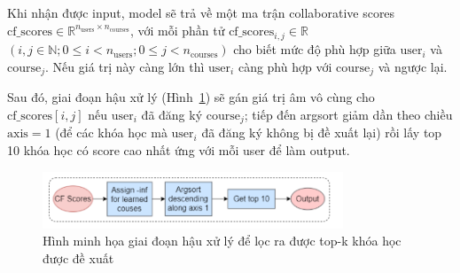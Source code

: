 Khi nhận được input, model sẽ trả về một ma trận collaborative scores $\text{cf\_scores} \in \mathbb{R}^{n_{\text{users}} \times n_{\text{courses}}}$, với mỗi phần tử $\text{cf\_scores}_{i,j} \in \mathbb{R}$ $(i,j \in \mathbb{N}; 0 \leq i < n_{\text{users}}; 0 \leq j < n_{\text{courses}})$ cho biết mức độ phù hợp giữa $\text{user}_i$ và $\text{course}_j$. Nếu giá trị này càng lớn thì $\text{user}_i$ càng phù hợp với $\text{course}_j$ và ngược lại.

Sau đó, giai đoạn hậu xử lý (Hình~\ref{fig:image2}) sẽ gán giá trị âm vô cùng cho $\text{cf\_scores}[i, j]$ nếu $\text{user}_i$ đã đăng ký $\text{course}_j$; tiếp đến argsort giảm dần theo chiều $\text{axis} = 1$ (để các khóa học mà $\text{user}_i$ đã đăng ký không bị đề xuất lại) rồi lấy top 10 khóa học có score cao nhất ứng với mỗi user để làm output.

\begin{figure}[h]
    \centering
    \includegraphics[width=0.8\textwidth]{figures/70.png}
    \caption{Hình minh họa giai đoạn hậu xử lý để lọc ra được top-k khóa học được đề xuất}
    \label{fig:image2}
\end{figure}

